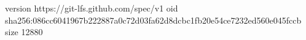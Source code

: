version https://git-lfs.github.com/spec/v1
oid sha256:086cc6041967b222887a0c72d03fa62d8dcbc1fb20e54ce7232ed560e045fccb
size 12880
